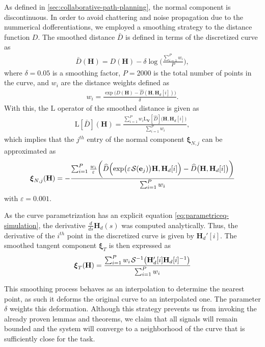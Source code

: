 As defined in \cref{sec:collaborative-path-planning}, the normal component is discontinuous. In order to avoid chattering and noise propagation due to the nummerical dofferentiations, we employed a smoothing strategy to the distance function $D$. The smoothed distance $\bar{D}$ is defined in terms of the discretized curve as
\begin{align}
    \bar{D}(\mathbf{H}) = D(\mathbf{H}) - \delta\log\biggl(\frac{\sum_{i=1}^{P}w_i}{P}\biggr),
\end{align}
where $\delta=0.05$ is a smoothing factor, $P=\num{2000}$ is the total number of points in the curve, and $w_i$ are the distance weights defined as
\begin{align}
    w_i = \frac{\exp\bigl(D(\mathbf{H}) - \widehat{D}(\mathbf{H}, \mathbf{H}_d[i])\bigr)}{\delta}.
\end{align}
With this, the $\text{L}$ operator of the smoothed distance is given as
\begin{align}
    \text{L}[\bar{D}](\mathbf{H}) = \frac{\sum_{i=1}^{P}w_i\text{L}_\mathbf{V}[\widehat{D}]\bigl(\mathbf{H}, \mathbf{H}_d[i]\bigr)}{\sum_{i=1}^{P}w_i},
\end{align}
which implies that the $j^{th}$ entry of the normal component $\boldsymbol{\xi}_{N,j}$ can be approximated as
\begin{align}
    \boldsymbol{\xi}_{N,j}(\mathbf{H}) = -\frac{\sum_{i=1}^{P} \frac{w_i}{\varepsilon}\biggl(\widehat{D}\Bigl(\exp\bigl(\varepsilon\SL[\mathbf{e}_j]\bigr)\mathbf{H}, \mathbf{H}_d[i]\Bigr)- \widehat{D}\bigl(\mathbf{H}, \mathbf{H}_d[i]\bigr)\biggr)}{\sum_{i=1}^{P}w_i}
\end{align}
with $\varepsilon=0.001$.

As the curve parametrization has an explicit equation \cref{eq:parametriceq-simulation}, the derivative $\frac{d}{ds}\mathbf{H}_d(s)$ was computed analytically. Thus, the derivative of the $i^{th}$ point in the discretized curve is given by $\mathbf{H}_d'[i]$. The smoothed tangent component $\boldsymbol{\xi}_T$ is then expressed as
\begin{align}
    \boldsymbol{\xi}_T(\mathbf{H}) = \frac{\sum_{i=1}^{P} w_i\invSL\bigl(\mathbf{H}_d'[i]\mathbf{H}_d[i]^{-1}\bigr)}{\sum_{i=1}^{P} w_i}
\end{align}

This smoothing process behaves as an interpolation to determine the nearest point, as such it deforms the original curve to an interpolated one. The parameter $\delta$ weights this deformation. Although this strategy prevents us from invoking the already proven lemmas and theorems, we claim that all signals will remain bounded and the system will converge to a neighborhood of the curve that is sufficiently close for the task.

